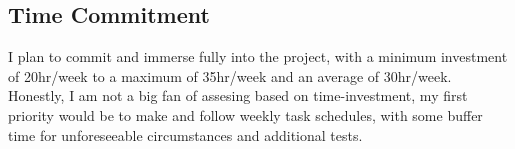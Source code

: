 \subsection{Time Commitment}
    I plan to commit and immerse fully into the project, with a minimum investment of 20hr/week to a maximum of 35hr/week and an average of 30hr/week.
    Honestly, I am not a big fan of assesing based on time-investment, my first priority would be to make and follow weekly task schedules, with some buffer time for unforeseeable circumstances and additional tests. 
